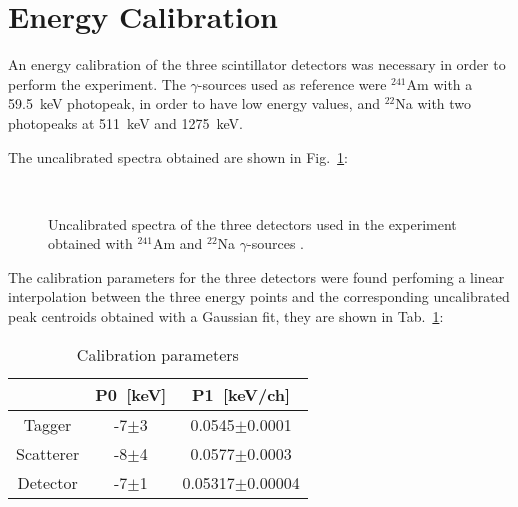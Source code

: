 \newpage
\section*{Energy Calibration}

An energy calibration of the three scintillator detectors was necessary in order to perform the experiment. The $\gamma$-sources used as reference were $^{241}$Am with a 59.5~keV photopeak, in order to have low energy values, and $^{22}$Na with two photopeaks at 511~keV and 1275~keV.

The uncalibrated spectra obtained are shown in Fig.~\ref{Fig:Uncalibrated_spectra}:

\begin{figure}[h!]
	\centering
	 \quad
	 \quad
	 \quad
	 \quad
	 \quad
	 \\
	\caption{Uncalibrated spectra of the three detectors used in the experiment obtained with $^{241}$Am and $^{22}$Na $\gamma$-sources .}
	\label{Fig:Uncalibrated_spectra}
\end{figure}

The calibration parameters for the three detectors were found perfoming a linear interpolation between the three energy points and the corresponding uncalibrated peak centroids obtained with a Gaussian fit, they are shown in Tab.~\ref{Tab:Calibration parameters}:

\begin{table}[H]
\centering
\begin{tabular}{c|cc}
\toprule
\toprule
 & P0~[keV] & P1~[keV/ch] \\
\midrule
Tagger & -7$\pm$3 &  0.0545$\pm$0.0001 \\
Scatterer & -8$\pm$4 & 0.0577$\pm$0.0003 \\
Detector & -7$\pm$1 & 0.05317$\pm$0.00004 \\
\bottomrule
\bottomrule
\end{tabular}
\caption{Calibration parameters}
\label{Tab:Calibration parameters}
\end{table}